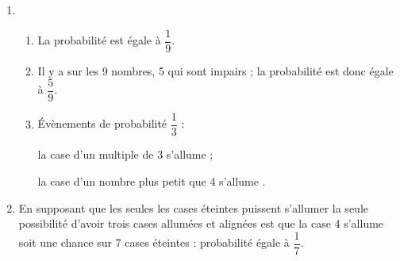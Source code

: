 
\medskip

%
%
%

\begin{enumerate}
\item 
	\begin{enumerate}
		\item %
La probabilité est égale à $\dfrac{1}{9}$.
		\item %
		Il y a sur les 9 nombres, 5 qui sont impairs ; la probabilité est donc égale à $\dfrac{5}{9}$.		
		\item %
Évènements de probabilité  $\dfrac{1}{3}$ : 

\og la case d'un multiple de 3 s'allume \fg ;

\og la case d'un nombre plus petit que 4 s'allume \fg.
	\end{enumerate}
\item %
En supposant que les seules les cases éteintes puissent s'allumer la seule possibilité d'avoir trois cases allumées et alignées est que la case 4 s'allume soit une chance sur 7 cases éteintes : probabilité égale à $\dfrac{1}{7}$.
\end{enumerate}

\vspace{0,5cm}

